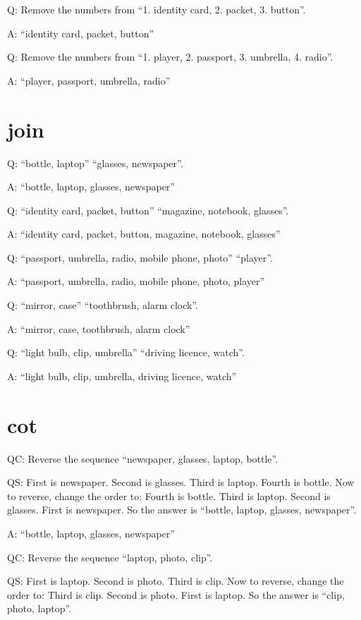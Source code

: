 \documentclass[
]{article}
\begin{document}
Q: Remove the numbers from ``1. identity card, 2. packet, 3. button''.

A: ``identity card, packet, button''

Q: Remove the numbers from ``1. player, 2. passport, 3. umbrella, 4.
radio''.

A: ``player, passport, umbrella, radio''

\section{join}\label{join}

Q: ``bottle, laptop'' ``glasses, newspaper''.

A: ``bottle, laptop, glasses, newspaper''

Q: ``identity card, packet, button'' ``magazine, notebook, glasses''.

A: ``identity card, packet, button, magazine, notebook, glasses''

Q: ``passport, umbrella, radio, mobile phone, photo'' ``player''.

A: ``passport, umbrella, radio, mobile phone, photo, player''

Q: ``mirror, case'' ``toothbrush, alarm clock''.

A: ``mirror, case, toothbrush, alarm clock''

Q: ``light bulb, clip, umbrella'' ``driving licence, watch''.

A: ``light bulb, clip, umbrella, driving licence, watch''

\section{cot}\label{cot-1}

QC: Reverse the sequence ``newspaper, glasses, laptop, bottle''.

QS: First is newspaper. Second is glasses. Third is laptop. Fourth is
bottle. Now to reverse, change the order to: Fourth is bottle. Third is
laptop. Second is glasses. First is newspaper. So the answer is
``bottle, laptop, glasses, newspaper''.

A: ``bottle, laptop, glasses, newspaper''

QC: Reverse the sequence ``laptop, photo, clip''.

QS: First is laptop. Second is photo. Third is clip. Now to reverse,
change the order to: Third is clip. Second is photo. First is laptop. So
the answer is ``clip, photo, laptop''.
\end{document}
